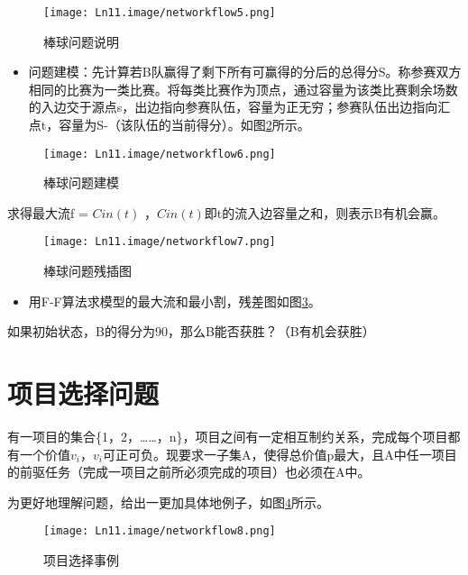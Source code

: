 \begin{figure}[htb]
  \centering
  \texttt{[image: Ln11.image/networkflow5.png]}
  \caption{棒球问题说明}\label{fig5}
\end{figure}

\begin{itemize}
  \item 问题建模：先计算若B队赢得了剩下所有可赢得的分后的总得分S。称参赛双方相同的比赛为一类比赛。将每类比赛作为顶点，通过容量为该类比赛剩余场数的入边交于源点s，出边指向参赛队伍，容量为正无穷；参赛队伍出边指向汇点t，容量为S-（该队伍的当前得分）。如图\ref{fig6}所示。
\end{itemize}

\begin{figure}[h]
  \centering
  \texttt{[image: Ln11.image/networkflow6.png]}
  \caption{棒球问题建模}\label{fig6}
\end{figure}

求得最大流f = \(Cin(t)\) ，\(Cin(t)\)即t的流入边容量之和，则表示B有机会赢。

\begin{figure}[htb]
  \centering
  \texttt{[image: Ln11.image/networkflow7.png]}
  \caption{棒球问题残插图}\label{fig7}
\end{figure}

\begin{itemize}
  \item 用F-F算法求模型的最大流和最小割，残差图如图\ref{fig7}。
\end{itemize}
\begin{example}
如果初始状态，B的得分为90，那么B能否获胜？（B有机会获胜）
\end{example}

\section{项目选择问题}
\begin{example}
有一项目的集合\{1，2，……，n\}，项目之间有一定相互制约关系，完成每个项目都有一个价值\(v_i\)，\(v_i\)可正可负。现要求一子集A，使得总价值p最大，且A中任一项目的前驱任务（完成一项目之前所必须完成的项目）也必须在A中。
\end{example}

为更好地理解问题，给出一更加具体地例子，如图\ref{fig8}所示。
\begin{figure}[htb]
  \centering
  \texttt{[image: Ln11.image/networkflow8.png]}
  \caption{项目选择事例}\label{fig8}
\end{figure}

